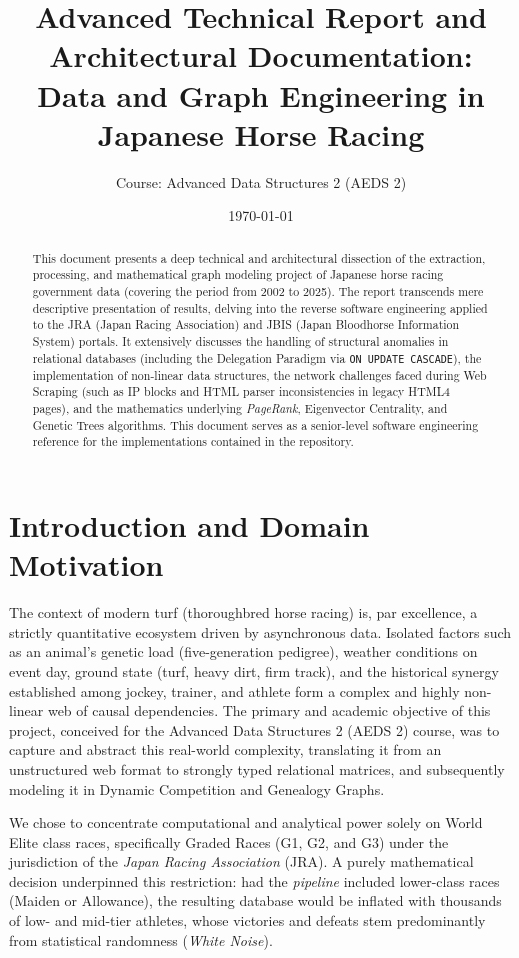 \documentclass[12pt,a4paper]{article}
\title{\textbf{Advanced Technical Report and Architectural Documentation:\\Data and Graph Engineering in Japanese Horse Racing}}
\author{Course: Advanced Data Structures 2 (AEDS 2)}
\date{\today}
\begin{document}
\maketitle
\tableofcontents
\newpage

\begin{abstract}
This document presents a deep technical and architectural dissection of the extraction, processing, and mathematical graph modeling project of Japanese horse racing government data (covering the period from 2002 to 2025). The report transcends mere descriptive presentation of results, delving into the reverse software engineering applied to the JRA (Japan Racing Association) and JBIS (Japan Bloodhorse Information System) portals. It extensively discusses the handling of structural anomalies in relational databases (including the Delegation Paradigm via \texttt{ON UPDATE CASCADE}), the implementation of non-linear data structures, the network challenges faced during Web Scraping (such as IP blocks and HTML parser inconsistencies in legacy HTML4 pages), and the mathematics underlying \textit{PageRank}, Eigenvector Centrality, and Genetic Trees algorithms. This document serves as a senior-level software engineering reference for the implementations contained in the repository.
\end{abstract}

\section{Introduction and Domain Motivation}
The context of modern turf (thoroughbred horse racing) is, par excellence, a strictly quantitative ecosystem driven by asynchronous data. Isolated factors such as an animal's genetic load (five-generation pedigree), weather conditions on event day, ground state (turf, heavy dirt, firm track), and the historical synergy established among jockey, trainer, and athlete form a complex and highly non-linear web of causal dependencies. The primary and academic objective of this project, conceived for the Advanced Data Structures 2 (AEDS 2) course, was to capture and abstract this real-world complexity, translating it from an unstructured web format to strongly typed relational matrices, and subsequently modeling it in Dynamic Competition and Genealogy Graphs.

We chose to concentrate computational and analytical power solely on World Elite class races, specifically Graded Races (G1, G2, and G3) under the jurisdiction of the \textit{Japan Racing Association} (JRA). A purely mathematical decision underpinned this restriction: had the \textit{pipeline} included lower-class races (Maiden or Allowance), the resulting database would be inflated with thousands of low- and mid-tier athletes, whose victories and defeats stem predominantly from statistical randomness (\textit{White Noise}).
\end{document}
